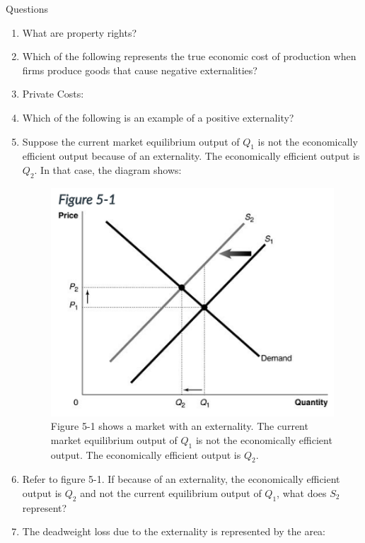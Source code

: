 \begin{center}
    Questions
\end{center}
\begin{enumerate}
    \item What are property rights?
    \item Which of the following represents the true economic cost of production when firms produce goods that cause negative externalities?
    \item Private Costs:
    \item Which of the following is an example of a positive externality?
    \item Suppose the current market equilibrium output of $Q_1$ is not the economically efficient output because of an externality.
    The economically efficient output is $Q_2$.
    In that case, the diagram shows:
    \begin{figure}[h!]
        \includegraphics{images/Question5.png}
        \caption{Figure 5-1 shows a market with an externality. The current market equilibrium output of $Q_1$ is not the economically efficient output. The economically efficient output is $Q_2$.}
    \end{figure}
    \item Refer to figure 5-1.
    If because of an externality, the economically efficient output is $Q_2$ and not the current equilibrium output of $Q_1$, what does $S_2$ represent?
    \item The deadweight loss due to the externality is represented by the area:
    \begin{figure}[h!]

\end{figure}
\end{enumerate}

